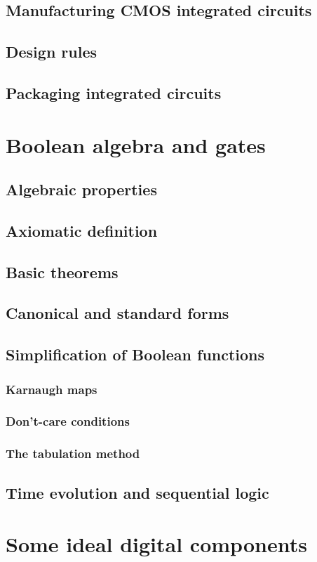 \documentclass{report}
\begin{document}
\section{Manufacturing CMOS integrated circuits}
\section{Design rules}
\section{Packaging integrated circuits}

\chapter{Boolean algebra and gates}
\section{Algebraic properties}
\section{Axiomatic definition}
\section{Basic theorems}
\section{Canonical and standard forms}
\section{Simplification of Boolean functions}
\subsection{Karnaugh maps}
\subsection{Don't-care conditions}
\subsection{The tabulation method}
\section{Time evolution and sequential logic}
\chapter{Some ideal digital components}
\end{document}
